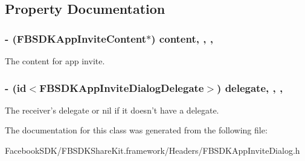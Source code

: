 \subsection{Property Documentation}
\hypertarget{interface_f_b_s_d_k_app_invite_dialog_a18b98a61c112122c1baf3a36047c9cda}{
\subsubsection[{content}]{\setlength{\rightskip}{0pt plus 5cm}-\/ ({\bf F\-B\-S\-D\-K\-App\-Invite\-Content}$\ast$) content\hspace{0.3cm}{\ttfamily [read]}, {\ttfamily [write]}, {\ttfamily [nonatomic]}, {\ttfamily [copy]}}}\label{interface_f_b_s_d_k_app_invite_dialog_a18b98a61c112122c1baf3a36047c9cda}
The content for app invite. \hypertarget{interface_f_b_s_d_k_app_invite_dialog_afd09a07b729c7263d4c3d9e5b0b62ada}{
\subsubsection[{delegate}]{\setlength{\rightskip}{0pt plus 5cm}-\/ (id$<${\bf F\-B\-S\-D\-K\-App\-Invite\-Dialog\-Delegate}$>$) delegate\hspace{0.3cm}{\ttfamily [read]}, {\ttfamily [write]}, {\ttfamily [nonatomic]}, {\ttfamily [weak]}}}\label{interface_f_b_s_d_k_app_invite_dialog_afd09a07b729c7263d4c3d9e5b0b62ada}
The receiver's delegate or nil if it doesn't have a delegate. 

The documentation for this class was generated from the following file\-:\begin{DoxyCompactItemize}
\item 
Facebook\-S\-D\-K/\-F\-B\-S\-D\-K\-Share\-Kit.\-framework/\-Headers/F\-B\-S\-D\-K\-App\-Invite\-Dialog.\-h\end{DoxyCompactItemize}
